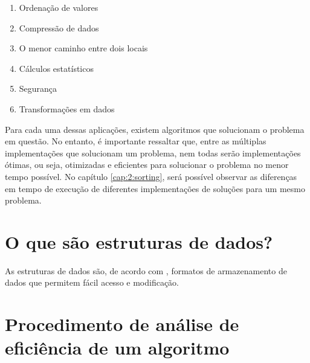 \begin{enumerate}
    \item Ordenação de valores
    \item Compressão de dados
    \item O menor caminho entre dois locais
    \item Cálculos estatísticos
    \item Segurança
    \item Transformações em dados
\end{enumerate}

Para cada uma dessas aplicações, existem algoritmos que solucionam o problema em questão. No entanto, é importante
ressaltar que, entre as múltiplas implementações que solucionam um problema, nem todas serão implementações ótimas,
ou seja, otimizadas e eficientes para solucionar o problema no menor tempo possível. No capítulo \ref{cap:2:sorting},
será possível observar as diferenças em tempo de execução de diferentes implementações de soluções para um mesmo
problema.

\section{O que são estruturas de dados?}

As estruturas de dados são, de acordo com \cite{cormen2022algorithms}, formatos de armazenamento de dados
que permitem fácil acesso e modificação.

\section{Procedimento de análise de eficiência de um algoritmo}


